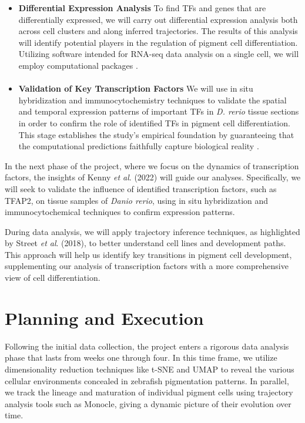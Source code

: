 \documentclass[runningheads]{llncs}
\begin{document}
    \begin{itemize}
        \item \textbf{Differential Expression Analysis}
        To find TFs and genes that are differentially expressed, we will carry out differential expression analysis both across cell clusters and along inferred trajectories. The results of this analysis will identify potential players in the regulation of pigment cell differentiation. Utilizing software intended for RNA-seq data analysis on a single cell, we will employ computational packages \cite{nayak2021hitchhiker,kulkarni2019beyond}.        
        \paragraph{}
        \item \textbf{Validation of Key Transcription Factors}
        We will use in situ hybridization and immunocytochemistry techniques to validate the spatial and temporal expression patterns of important TFs in \textit{D. rerio} tissue sections in order to confirm the role of identified TFs in pigment cell differentiation. This stage establishes the study's empirical foundation by guaranteeing that the computational predictions faithfully capture biological reality \cite{phipson2022propeller}.        
    \end{itemize}

In the next phase of the project, where we focus on the dynamics of transcription factors, the insights of Kenny \textit{et al}. (2022) will guide our analyses. Specifically, we will seek to validate the influence of identified transcription factors, such as TFAP2, on tissue samples of \textit{Danio rerio}, using in situ hybridization and immunocytochemical techniques to confirm \cite{kenny2022tfap2} expression patterns.

During data analysis, we will apply trajectory inference techniques, as highlighted by Street \textit{et al}. (2018), to better understand cell lines and development paths. This approach will help us identify key transitions in pigment cell development, supplementing our analysis of transcription factors with a more comprehensive view of cell differentiation.

\section{Planning and Execution}
Following the initial data collection, the project enters a rigorous data analysis phase that lasts from weeks one through four. In this time frame, we utilize dimensionality reduction techniques like t-SNE and UMAP to reveal the various cellular environments concealed in zebrafish pigmentation patterns. In parallel, we track the lineage and maturation of individual pigment cells using trajectory analysis tools such as Monocle, giving a dynamic picture of their evolution over time.
\end{document}
